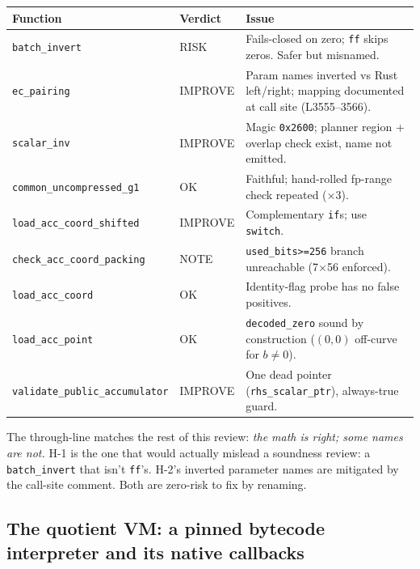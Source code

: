 \begin{center}
\small
\begin{tabular}{@{}p{}p{}p{}@{}}
\toprule
\textbf{Function} & \textbf{Verdict} & \textbf{Issue} \\
\midrule
\texttt{batch\_invert} & \textcolor{rustorange}{RISK} & Fails-closed on zero; \texttt{ff} skips zeros. Safer but misnamed. \\
\texttt{ec\_pairing} & \textcolor{codegenblue}{IMPROVE} & Param names inverted vs Rust left/right; mapping documented at call site (L3555--3566). \\
\texttt{scalar\_inv} & \textcolor{codegenblue}{IMPROVE} & Magic \texttt{0x2600}; planner region + overlap check exist, name not emitted. \\
\texttt{common\_\allowbreak{}uncompressed\_\allowbreak{}g1} & \textcolor{tracegreen}{OK} & Faithful; hand-rolled fp-range check repeated ($\times$3). \\
\texttt{load\_\allowbreak{}acc\_\allowbreak{}coord\_\allowbreak{}shifted} & \textcolor{codegenblue}{IMPROVE} & Complementary \texttt{if}s; use \texttt{switch}. \\
\texttt{check\_\allowbreak{}acc\_\allowbreak{}coord\_\allowbreak{}packing} & \textcolor{mathpurple}{NOTE} & \texttt{used\_bits>=256} branch unreachable (7$\times$56 enforced). \\
\texttt{load\_acc\_coord} & \textcolor{tracegreen}{OK} & Identity-flag probe has no false positives. \\
\texttt{load\_acc\_point} & \textcolor{tracegreen}{OK} & \texttt{decoded\_zero} sound by construction ($(0,0)$ off-curve for $b\ne0$). \\
\texttt{validate\_\allowbreak{}public\_\allowbreak{}accumulator} & \textcolor{codegenblue}{IMPROVE} & One dead pointer (\texttt{rhs\_scalar\_ptr}), always-true guard. \\
\bottomrule
\end{tabular}
\end{center}

The through-line matches the rest of this review: \emph{the math is
right; some names are not.} H-1 is the one that would actually
mislead a soundness review: a \texttt{batch\_invert} that isn't
\texttt{ff}'s. H-2's inverted parameter names are mitigated by the
call-site comment. Both are zero-risk to fix by renaming.

\subsection{The quotient VM: a pinned bytecode interpreter and its native callbacks}
\label{sec:pr-vm}

